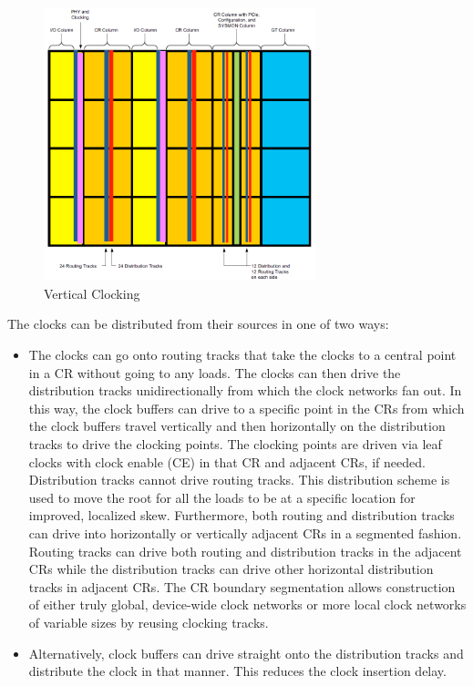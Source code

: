 \documentclass[12pt, a4paper]{report}
\begin{document}
    \begin{figure}[H]
        \begin{center}
            \includegraphics[width=0.7\textwidth]{images/VertClock.png}
            \caption{Vertical Clocking}
            \label{VertClock}
        \end{center}
    \end{figure}

    The clocks can be distributed from their sources in one of two ways:
    \begin{itemize}
        \item The clocks can go onto routing tracks that take the clocks to a central point in a CR
        without going to any loads. The clocks can then drive the distribution tracks
        unidirectionally from which the clock networks fan out. In this way, the clock buffers
        can drive to a specific point in the CRs from which the clock buffers travel vertically and
        then horizontally on the distribution tracks to drive the clocking points. The clocking points are driven via leaf clocks with clock enable (CE) in that CR and adjacent CRs, if
        needed. Distribution tracks cannot drive routing tracks.
        This distribution scheme is used to move the root for all the loads to be at a specific
        location for improved, localized skew. Furthermore, both routing and distribution tracks can drive into horizontally or vertically adjacent CRs in a segmented fashion. Routing
        tracks can drive both routing and distribution tracks in the adjacent CRs while the
        distribution tracks can drive other horizontal distribution tracks in adjacent CRs. The CR
        boundary segmentation allows construction of either truly global, device-wide clock
        networks or more local clock networks of variable sizes by reusing clocking tracks.

        \item Alternatively, clock buffers can drive straight onto the distribution tracks and distribute the clock in that manner. This reduces the clock insertion delay.
    \end{itemize}
\end{document}
